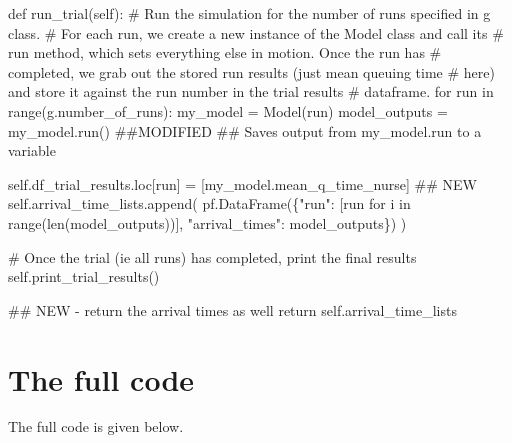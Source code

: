 \documentclass[
  letterpaper,
  DIV=11,
  numbers=noendperiod]{scrreprt}
\newenvironment{Shaded}{}{}
\newcommand{\BuiltInTok}[1]{\textcolor[rgb]{0.84,0.23,0.29}{#1}}
\newcommand{\CommentTok}[1]{\textcolor[rgb]{0.42,0.45,0.49}{#1}}
\newcommand{\ControlFlowTok}[1]{\textcolor[rgb]{0.84,0.23,0.29}{#1}}
\newcommand{\KeywordTok}[1]{\textcolor[rgb]{0.84,0.23,0.29}{#1}}
\newcommand{\NormalTok}[1]{\textcolor[rgb]{0.14,0.16,0.18}{#1}}
\newcommand{\OperatorTok}[1]{\textcolor[rgb]{0.14,0.16,0.18}{#1}}
\newcommand{\StringTok}[1]{\textcolor[rgb]{0.01,0.18,0.38}{#1}}
\newcommand{\VariableTok}[1]{\textcolor[rgb]{0.89,0.38,0.04}{#1}}
\begin{document}
\begin{Shaded}
\begin{Highlighting}[]
\KeywordTok{def}\NormalTok{ run\_trial(}\VariableTok{self}\NormalTok{):}
    \CommentTok{\# Run the simulation for the number of runs specified in g class.}
    \CommentTok{\# For each run, we create a new instance of the Model class and call its}
    \CommentTok{\# run method, which sets everything else in motion.  Once the run has}
    \CommentTok{\# completed, we grab out the stored run results (just mean queuing time}
    \CommentTok{\# here) and store it against the run number in the trial results}
    \CommentTok{\# dataframe.}
    \ControlFlowTok{for}\NormalTok{ run }\KeywordTok{in} \BuiltInTok{range}\NormalTok{(g.number\_of\_runs):}
\NormalTok{        my\_model }\OperatorTok{=}\NormalTok{ Model(run)}
\NormalTok{        model\_outputs }\OperatorTok{=}\NormalTok{ my\_model.run() }\CommentTok{\#\#MODIFIED}
        \CommentTok{\#\# Saves output from my\_model.run to a variable}

        \VariableTok{self}\NormalTok{.df\_trial\_results.loc[run] }\OperatorTok{=}\NormalTok{ [my\_model.mean\_q\_time\_nurse]}
        \CommentTok{\#\# NEW}
        \VariableTok{self}\NormalTok{.arrival\_time\_lists.append(}
\NormalTok{              pf.DataFrame(\{}\StringTok{"run"}\NormalTok{: [run }\ControlFlowTok{for}\NormalTok{ i }\KeywordTok{in} \BuiltInTok{range}\NormalTok{(}\BuiltInTok{len}\NormalTok{(model\_outputs))], }\StringTok{"arrival\_times"}\NormalTok{: model\_outputs\})}
\NormalTok{              )}

    \CommentTok{\# Once the trial (ie all runs) has completed, print the final results}
    \VariableTok{self}\NormalTok{.print\_trial\_results()}

    \CommentTok{\#\# NEW {-} return the arrival times as well}
    \ControlFlowTok{return} \VariableTok{self}\NormalTok{.arrival\_time\_lists}
\end{Highlighting}
\end{Shaded}

\section{The full code}\label{the-full-code-6}

The full code is given below.
\end{document}
